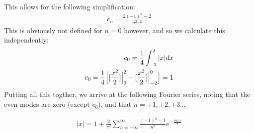 \documentclass{article}
\begin{document}
This allows for the following simplification:
\begin{equation}
\begin{aligned}
c_n = \frac{2(-1)^n - 2}{n^2\pi^2}
\end{aligned}
\end{equation}
This is obviously not defined for $n=0$ however, and so we calculate this independently:
\begin{equation}
\begin{aligned}
c_0 = \frac{1}{4}\int_{-2}^2|x|dx\\
c_0 = \frac{1}{4} \Big{[}[\frac{x^2}{2}]\Big{|}_0^2 - [\frac{x^2}{2}]\Big{|}_{-2}^0 \Big{]} = 1
\end{aligned}
\end{equation}
Putting all this togther, we arrive at the following Fourier series, noting that the even modes are zero (except $c_0$), and that $n = \pm 1, \pm 2, \pm 3...$
\begin{tcolorbox}[minipage,colback=white,arc=0pt,outer arc=0pt]
\begin{equation}
\begin{aligned}
|x| = 1 + \frac{2}{\pi^2}\sum_{n=-\infty}^{\infty}\frac{(-1)^n - 1}{n^2}e^{-\frac{in\pi x}{2}}
\end{aligned}
\end{equation}
\end{tcolorbox}
\end{document}
